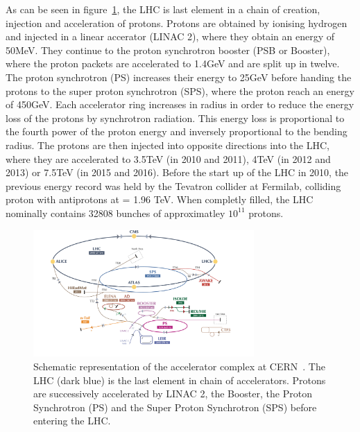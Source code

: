  As can be seen in figure~\ref{fig:LHCchain}, the LHC is last element in a chain of creation, injection and acceleration of protons. Protons are obtained by ionising hydrogen and injected in a linear accerator (LINAC 2), where they obtain an energy of 50\si{ \MeV}. They continue to the proton synchrotron booster (PSB or Booster), where the proton packets are accelerated to 1.4\si{ \GeV} and are split up in twelve. The proton synchrotron (PS) increases their energy to 25\si{ \GeV} before handing the protons to the super proton synchrotron (SPS), where the proton reach an energy of 450\si{ \GeV}. Each accelerator ring increases in radius in order to reduce the energy loss of the protons by synchrotron radiation. This energy loss is proportional to the fourth power of the proton energy and inversely proportional to the bending radius. The protons are then injected into opposite directions into the LHC, where they are accelerated to 3.5\si{ \TeV} (in 2010 and 2011), 4\si{ \TeV} (in 2012 and 2013) or 7.5\si{ \TeV} (in 2015 and 2016). Before the start up of the LHC in 2010, the previous energy record was held by the Tevatron collider at Fermilab, colliding proton with antiprotons at \com = 1.96 \si{ \TeV}. When completly filled, the LHC nominally contains 32808 bunches of approximatley $10^{11}$ protons. 
 
 \begin{figure}[h]
	\centering
	\includegraphics[width=0.75\textwidth]{2_ExperimentalSetup/Figures/CCC-v2016}
	\caption{Schematic representation of the accelerator complex at CERN~\cite{DeMelis:2197559}. The LHC (dark blue) is the last element in chain of accelerators. Protons are successively accelerated by LINAC 2, the Booster, the Proton Synchrotron (PS) and the Super Proton Synchrotron (SPS) before entering the LHC.}
	\label{fig:LHCchain}
\end{figure}

